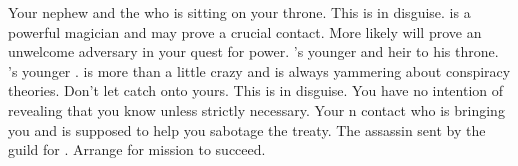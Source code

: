 \documentclass[char]{NeptuneBall}
\begin{document}
\begin{contacts}
  \contact{\cKing{}} Your nephew and the \cKing{\mer} who is sitting on your throne.
  \contact{\cWitch{}} This is \cWitch{} in disguise. \cWitch{\They} is a powerful magician and may prove a crucial contact. More likely \cWitch{\they} will prove an unwelcome adversary in your quest for power.
  \contact{\cPrincess{}} \cKing{}'s younger \cPrincess{\offspring} and heir to his throne.
  \contact{\cPlant{}} \cKing{}'s younger \cPlant{\sibling}. \cPlant{\they} is more than a little crazy and is always yammering about conspiracy theories. Don't let \cPlant{\them} catch onto yours.
  \contact{\cQueen{}} This is \cQueen{} in disguise. You have no intention of revealing that you know \cQueen{\them} unless strictly necessary.
  \contact{\cSpy{}} Your \pPacifica{}n contact who is bringing you \iHemlock{} and is supposed to help you sabotage the treaty.
	\contact{\cDiplomat{}} The assassin sent by the guild for \cQueen{}. Arrange for \cDiplomat{\their} mission to succeed.
\end{contacts}
\end{document}
